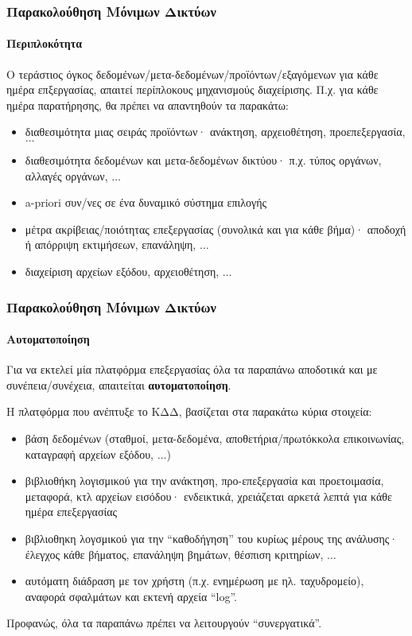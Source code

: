 \begin{frame}
  \frametitle{Παρακολούθηση Μόνιμων Δικτύων}
  \framesubtitle{Περιπλοκότητα}
  \label{}

    Ο τεράστιος όγκος δεδομένων/μετα-δεδομένων/προϊόντων/εξαγόμενων για κάθε ημέρα επξεργασίας,
    απαιτεί περίπλοκους μηχανισμούς διαχείρισης. Π.χ. για κάθε ημέρα παρατήρησης, θα πρέπει να
    απαντηθούν τα παρακάτω:
    \begin{itemize}
        \item διαθεσιμότητα μιας σειράς προϊόντων· ανάκτηση, αρχειοθέτηση, προεπεξεργασία, $\ldots$
        \item διαθεσιμότητα δεδομένων και μετα-δεδομένων δικτύου· π.χ. τύπος οργάνων, αλλαγές οργάνων, $\ldots$
        \item a-priori συν/νες σε ένα δυναμικό σύστημα επιλογής
        \item μέτρα ακρίβειας/ποιότητας επεξεργασίας (συνολικά και για κάθε βήμα)· αποδοχή ή απόρριψη εκτιμήσεων, επανάληψη, $\ldots$
        \item διαχείριση αρχείων εξόδου, αρχειοθέτηση, $\ldots$
    \end{itemize}
\end{frame}
\note{}

\begin{frame}
  \frametitle{Παρακολούθηση Μόνιμων Δικτύων}
  \framesubtitle{Αυτοματοποίηση}
  \label{}

    Για να εκτελεί μία πλατφόρμα επεξεργασίας όλα τα παραπάνω αποδοτικά και με συνέπεια/συνέχεια, απαιτείται
    \textbf{αυτοματοποίηση}.
    \vspace{0.3cm}

    Η πλατφόρμα που ανέπτυξε το ΚΔΔ, βασίζεται στα παρακάτω κύρια στοιχεία:
    \begin{itemize}
        \item βάση δεδομένων (σταθμοί, μετα-δεδομένα, αποθετήρια/πρωτόκκολα επικοινωνίας, καταγραφή αρχείων εξόδου, $\ldots$)
        \item βιβλιοθήκη λογισμικού για την ανάκτηση, προ-επεξεργασία και προετοιμασία, μεταφορά, κτλ αρχείων εισόδου·
            ενδεικτικά, χρειάζεται αρκετά λεπτά για κάθε ημέρα επεξεργασίας
        \item βιβλιοθηκη λογσμικού για την ``καθοδήγηση'' του κυρίως μέρους της ανάλυσης· έλεγχος κάθε βήματος,
            επανάληψη βημάτων, θέσπιση κριτηρίων, $\ldots$
        \item αυτόματη διάδραση με τον χρήστη (π.χ. ενημέρωση με ηλ. ταχυδρομείο), αναφορά σφαλμάτων και εκτενή
            αρχεία ``log''.
    \end{itemize}
    \vspace{0.3cm}

    Προφανώς, όλα τα παραπάνω πρέπει να λειτουργούν ``συνεργατικά''.
\end{frame}
\note{}

